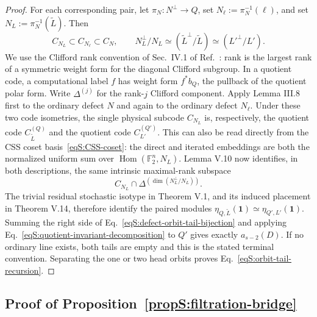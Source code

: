 \documentclass[journal,twocolumn]{IEEEtran}
\theoremstyle{definition}
\theoremstyle{plain}
\newcommand{\F}{\mathbb F}
\begin{document}
\begin{proof}
For each corresponding pair, let
$\pi_N:N^\perp\to Q$, set
$N_\ell:=\pi_N^{-1}(\ell)$, and set
$N_L:=\pi_N^{-1}(\widetilde L)$.  Then
\begin{equation}
 C_{N_L}\subset C_{N_\ell}\subset C_N,\qquad
 N_L^\perp/N_L
 \simeq(\widetilde L^\perp/\widetilde L)
 \simeq(L'^\perp/L').
 \label{eqS:double-quotient-code}
\end{equation}
We use the Clifford rank convention of Sec.~IV.1 of
Ref.~\cite{MontealegreGross2025}: rank is the largest rank of a symmetric
weight form for the diagonal Clifford subgroup.  In a quotient code, a
computational label $f$ has weight form $f^*b_Q$, the pullback of the
quotient polar form.  Write $\Delta^{(j)}$ for the rank-$j$ Clifford
component.
Apply Lemma III.8 first to the ordinary defect $N$ and again to the
ordinary defect $N_\ell$.  Under these two code isometries, the single
physical subcode $C_{N_L}$ is, respectively, the quotient code
$C_{\widetilde L}^{(Q)}$ and the quotient code $C_{L'}^{(Q')}$.
This can also be read directly from the CSS coset
basis~\eqref{eqS:CSS-coset}: the direct and iterated embeddings are both
the normalized uniform sum over
$\operatorname{Hom}(\F_2^n,N_L)$.  Lemma V.10 now identifies, in both
descriptions, the same intrinsic maximal-rank subspace
\begin{equation}
 C_{N_L}\cap
 \Delta^{(\dim(N_L^\perp/N_L))}.
 \label{eqS:same-maximal-rank-subspace}
\end{equation}
The trivial residual stochastic isotype in Theorem V.1, and its induced
placement in Theorem V.14, therefore identify the paired modules
$\eta_{Q,\widetilde L}(\bm1)\simeq\eta_{Q',L'}(\bm1)$.
Summing the right side of
Eq.~\eqref{eqS:defect-orbit-tail-bijection} and applying
Eq.~\eqref{eqS:quotient-invariant-decomposition} to $Q'$ gives exactly
$a_{s-2}(D)$.  If no ordinary line exists, both tails are empty and this
is the stated terminal convention.  Separating the one or two head
orbits proves Eq.~\eqref{eqS:orbit-tail-recursion}.
\end{proof}

\subsection{Proof of Proposition~\ref{propS:filtration-bridge}}
\label{app:proof-filtration-bridge}
\end{document}
